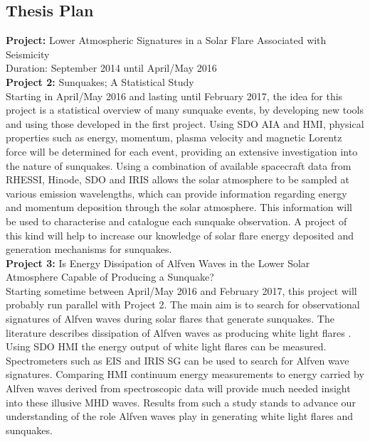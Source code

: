\subsection{Thesis Plan}\label{thesisplan}
\noindent
\textbf{Project:} Lower Atmospheric Signatures in a Solar Flare Associated with Seismicity\\
Duration: September 2014 until April/May 2016\\
\noindent
\textbf{Project 2:} Sunquakes; A Statistical Study\\
Starting in April/May 2016 and lasting until February 2017, the idea for this project is a statistical overview of many sunquake events, by developing new tools and using those developed in the first project. Using SDO AIA and HMI, physical properties such as energy, momentum, plasma velocity and magnetic Lorentz force will be determined for each event, providing an extensive investigation into the nature of sunquakes. Using a combination of available spacecraft data from RHESSI, Hinode, SDO and IRIS allows the solar atmosphere to be sampled at various emission wavelengths, which can provide information regarding energy and momentum deposition through the solar atmosphere. This information will be used to characterise and catalogue each sunquake observation. A project of this kind will help to increase our knowledge of solar flare energy deposited and generation mechanisms for sunquakes.\\
\noindent
\textbf{Project 3:} Is Energy Dissipation of Alfven Waves in the Lower Solar Atmosphere Capable of Producing a Sunquake? \\
Starting sometime between April/May 2016 and February 2017, this project will probably run parallel with Project 2. The main aim is to search for observational signatures of Alfven waves during solar flares that generate sunquakes. The literature describes dissipation of Alfven waves as producing white light flares \citep{1982SoPh...80...99E, 2013AGUFMSH51A2091F}. Using SDO HMI the energy output of white light flares can be measured. Spectrometers such as EIS and IRIS SG can be used to search for Alfven wave signatures. Comparing HMI continuum energy measurements to energy carried by Alfven waves derived from spectroscopic data will provide much needed insight into these illusive MHD waves. Results from such a study stands to advance our understanding of the role Alfven waves play in generating white light flares and sunquakes.   




